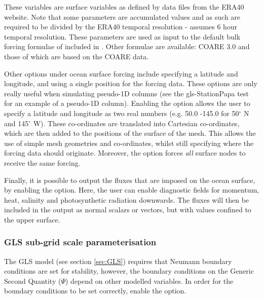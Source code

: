 These variables are surface variables as defined by data files from the ERA40 website. Note that some parameters are accumulated values
and as such are required to be divided by the ERA40 temporal resolution - \fluidity { } assumes 6 hour temporal resolution. 
These parameters are used as input to the default bulk forcing formulae of \citet{large2004} included in \fluidity. Other
formulae are available: COARE 3.0 \citep{fairall2003} and those of \citet{kara2005} which are based on the COARE data.

Other options under ocean surface forcing include specifying a latitude and longitude, and using a single position for the
forcing data. These options are only really useful when simulating pseudo-1D columns (see the gls-StationPapa test for an example
of a pseudo-1D column). Enabling the  option allows the user to specify a latitude and longitude as
two real numbers (e.g. 50.0 -145.0 for 50$^\circ$ N and 145$^\circ$ W). These co-ordinates are translated into Cartesian
co-ordinates, which are then added to the positions of the surface of the mesh. This allows the use of simple mesh geometries
and co-ordinates, whilst still specifying where the forcing data should originate. Moreover, the 
option forces \emph{all} surface nodes to receive the same forcing.

Finally, it is possible to output the fluxes that are imposed on the ocean surface, by enabling the
 option. Here, the user can enable diagnostic fields for momentum, heat, salinity and
photosynthetic radiation downwards. The fluxes will then be included in the output as normal scalars or vectors, but with values
confined to the upper surface.

\subsubsection{GLS sub-grid scale parameterisation}\label{sec:BCs:special:gls}

The GLS model (see section \ref{sec:GLS}) requires that Neumann boundary
conditions are set for stability, however, the boundary conditions on the
Generic Second Quantity ($\Psi$) depend on other modelled variables. In
order for the boundary conditions to be set correctly, enable the \linebreak
{}
option.

